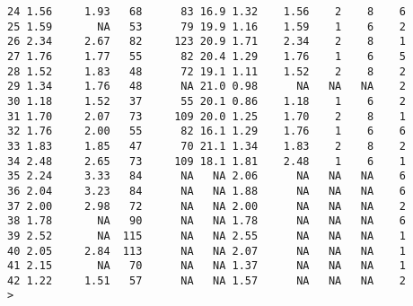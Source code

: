 \documentclass[titlepage]{article}  %
\begin{document}
\begin{verbatim}
24 1.56     1.93   68      83 16.9 1.32    1.56    2    8    6
25 1.59       NA   53      79 19.9 1.16    1.59    1    6    2
26 2.34     2.67   82     123 20.9 1.71    2.34    2    8    1
27 1.76     1.77   55      82 20.4 1.29    1.76    1    6    5
28 1.52     1.83   48      72 19.1 1.11    1.52    2    8    2
29 1.34     1.76   48      NA 21.0 0.98      NA   NA   NA    2
30 1.18     1.52   37      55 20.1 0.86    1.18    1    6    2
31 1.70     2.07   73     109 20.0 1.25    1.70    2    8    1
32 1.76     2.00   55      82 16.1 1.29    1.76    1    6    6
33 1.83     1.85   47      70 21.1 1.34    1.83    2    8    2
34 2.48     2.65   73     109 18.1 1.81    2.48    1    6    1
35 2.24     3.33   84      NA   NA 2.06      NA   NA   NA    6
36 2.04     3.23   84      NA   NA 1.88      NA   NA   NA    6
37 2.00     2.98   72      NA   NA 2.00      NA   NA   NA    2
38 1.78       NA   90      NA   NA 1.78      NA   NA   NA    6
39 2.52       NA  115      NA   NA 2.55      NA   NA   NA    1
40 2.05     2.84  113      NA   NA 2.07      NA   NA   NA    1
41 2.15       NA   70      NA   NA 1.37      NA   NA   NA    1
42 1.22     1.51   57      NA   NA 1.57      NA   NA   NA    2
> 
\end{verbatim}
\end{document}
